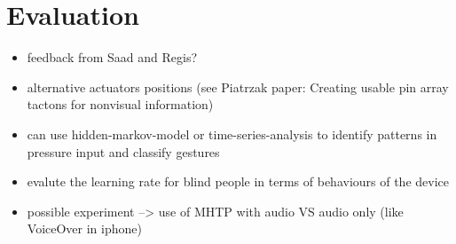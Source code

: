 \chapter{Evaluation}


\begin{itemize}
	\item feedback from Saad and Regis?
    \item alternative actuators positions (see Piatrzak paper: Creating usable pin array tactons for nonvisual information)
    \item can use hidden-markov-model or time-series-analysis to identify patterns in pressure input and classify gestures
    \item evalute the learning rate for blind people in terms of behaviours of the device
    \item possible experiment --> use of MHTP with audio VS audio only (like VoiceOver in iphone)
\end{itemize}